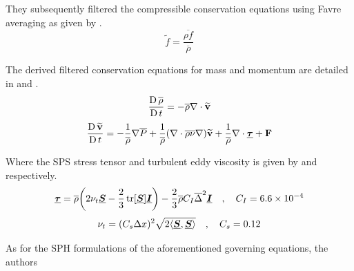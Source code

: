 They subsequently filtered the compressible conservation equations using Favre averaging as given by .
\begin{equation}
    \widetilde{f} = \frac{\overline{\rho f}}{\overline{\rho}}
    \label{eq:ROGERS2005-favre-averaging}
\end{equation}


The derived filtered conservation equations for mass and momentum are detailed in  and .
\begin{equation}
    \frac{\operatorname{D} \overline{\rho}}{\operatorname{D} t} = -\overline{\rho} \nabla \cdot \mathbf{\widetilde{v}}
    \label{eq:ROGERS2005-continuity-filtered}
\end{equation}
\begin{equation}
    \frac{\operatorname{D} \mathbf{\widetilde{v}}}{\operatorname{D} t} = - \frac{1}{\overline{\rho}}\nabla \overline{P} + \frac{1}{\overline{\rho}} (\nabla \cdot \overline{\rho \nu} \nabla) \mathbf{\widetilde{v}} + \frac{1}{\overline{\rho}}\nabla\cdot\underline{\bm{\tau}} + \mathbf{F}
    \label{eq:ROGERS2005-mom-filtered}
\end{equation}

Where the SPS stress tensor and turbulent eddy viscosity is given by  and  respectively.
\begin{equation}
    \underline{\bm{\tau}} = \overline{\rho}\bigg(2\nu_t \underline{\bm{S}} - \frac{2}{3}\operatorname{tr}[\underline{\bm{S}}]\underline{\bm{I}}\bigg) - \frac{2}{3}\overline{\rho}C_I \overline{\Delta}^2 \underline{\bm{I}} \quad , \quad C_I = 6.6 \times {10}^{-4}
    \label{eq:ROGERS2005-tau}
\end{equation}
\begin{equation}
    \nu_t = (C_s \Delta x)^2 \sqrt{2 \langle \underline{\bm{S}}, \underline{\bm{S}} \rangle} \quad , \quad C_s = 0.12
    \label{eq:ROGERS2005-turbulent-eddy-visc}
\end{equation}

As for the SPH formulations of the aforementioned governing equations, the authors

